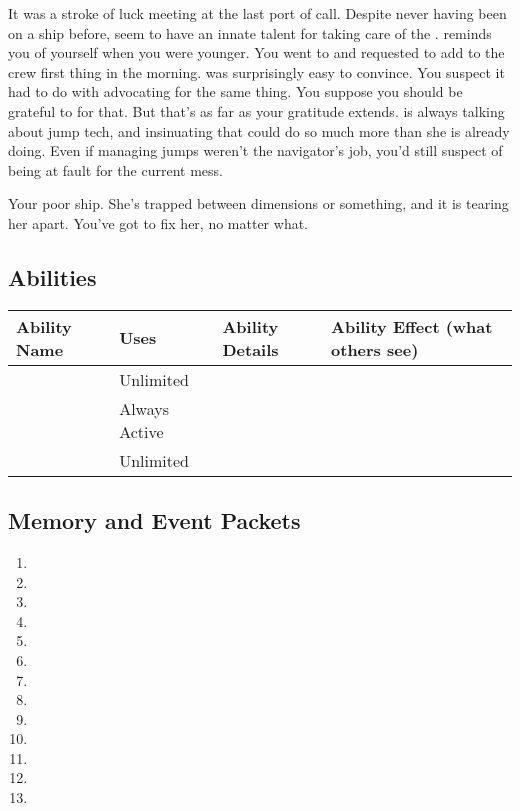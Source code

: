 \documentclass[char]{TMFHope}
\begin{document}
It was a stroke of luck meeting \cBoy{} at the last port of call. Despite never having been on a ship before, \cBoy{\they} seem\cBoy{\plural} to have an innate talent for taking care of the \pNew{}. \cBoy{} reminds you of yourself when you were younger. You went to \cCap{} and requested to add \cBoy{} to the crew first thing in the morning. \cCap{} was surprisingly easy to convince. You suspect it had to do with \cNav{} advocating for the same thing. You suppose you should be grateful to \cNav{\them} for that. But that's as far as your gratitude extends. \cNav{} is always talking about jump tech, and insinuating that \pNew{} could do so much more than she is already doing. Even if managing jumps weren't the navigator's job, you'd still suspect \cNav{} of being at fault for the current mess.

Your poor ship. She's trapped between dimensions or something, and it is tearing her apart. You've got to fix her, no matter what.

\subsection*{Abilities}
\begin{tabular}{|p{2.5cm}|p{1.5cm}|p{10cm}|p{2cm}|} 
 \hline
 \textbf{Ability Name} & \textbf{Uses} & \textbf{Ability Details} & \textbf{Ability Effect (what others see)} \\ 
\hline 
 \aEngineering{\MYname} & Unlimited & \aEngineering{\MYtext} & \aEngineering{\MYeffect} \\ 
\hline
 \aEyesight{\MYname} & Always Active & \aEyesight{\MYtext} & \aEyesight{\MYeffect}\\ 
 \hline
	\aPractice{\MYname} & Unlimited & \aPractice{\MYtext} & \aPractice{\MYeffect} \\ 
\hline
\end{tabular}

\subsection*{Memory and Event Packets}
\begin{enumerate}
	\item \mPractice{\MYname}
	\item \mEAlpha{\MYname}
	\item \mEngineerOne{\MYname}
	\item \mRepairsOne{\MYname}
	\item \mRepairsThree{\MYname}
	\item \mRepairsFive{\MYname}
	\item \mBroom{\MYname}
	\item \mLab{\MYname}
	\item \mPatient{\MYname}
	\item \mKitchen{\MYname}
	\item \mWeight{\MYname}
	\item \mTheater{\MYname}
	\item \mCrates{\MYname}
\end{enumerate}
\end{document}
